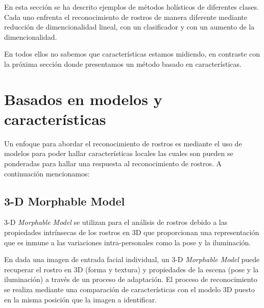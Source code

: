 
En esta sección se ha descrito ejemplos de métodos holísticos de diferentes clases. Cada uno enfrenta el reconocimiento de rostros de manera diferente mediante reducción de dimencionalidad lineal, con un clasificador y con un aumento de la dimencionalidad. 

En todos ellos no sabemos que características estamos midiendo, en contraste con la  próxima sección donde presentamos un método basado en características.

\section{Basados en modelos y características}
Un enfoque para abordar el reconocimiento de rostros es mediante el uso de modelos para poder hallar características locales las cuales son pueden se ponderadas para hallar una respuesta al reconocimiento de rostros. A continuación mencionamos:

\subsection{3-D Morphable Model}
3-D \textit{Morphable Model} se utilizan para el análisis de rostros debido a las propiedades intrínsecas de los rostros en 3D que proporcionan una representación que es inmune a las variaciones intra-personales como la pose y la iluminación. 

En \cite{huang2003component} dada una imagen de entrada facial individual, un 3-D \textit{Morphable Model} puede recuperar el rostro en 3D (forma y textura) y propiedades de la escena (pose y la iluminación) a través de un proceso de adaptación. El proceso de reconocimiento se realiza mediante una comparación de características con el modelo 3D puesto en la misma posición que la imagen a identificar.




